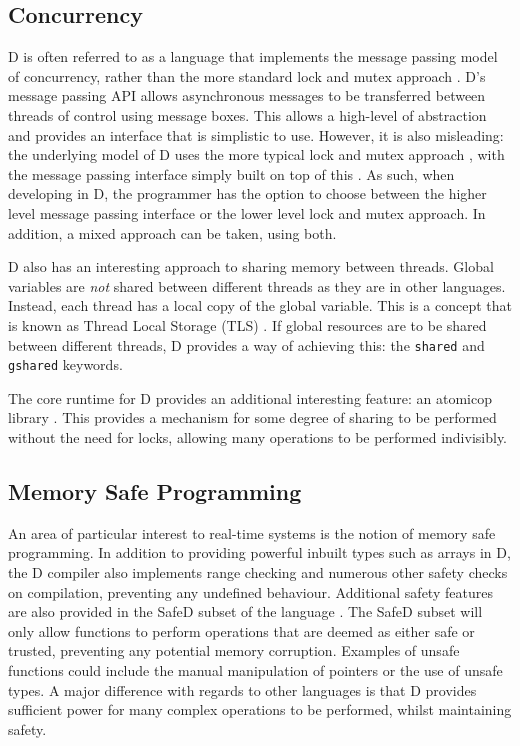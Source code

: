 \subsection{Concurrency}
D is often referred to as a language that implements the message passing model 
of concurrency, rather than the more standard lock and mutex approach 
\cite{ddili-book}. D's message passing API 
allows asynchronous messages to be transferred between threads of control using 
message boxes. This allows a high-level of abstraction and provides an 
interface that is simplistic to use. However, it is also misleading: the underlying 
model of D uses the more typical lock and mutex approach 
\cite{dlang-github-mutex}, 
with the message passing interface simply built on top of this 
\cite{dlang-github-concurrency}. 
As such, when developing in D, the programmer has the option to choose between 
the higher level message passing interface or the lower level lock and mutex 
approach. In addition, a mixed approach can be taken, using both. 
\par\bigskip\noindent
D also has an interesting approach to sharing memory between threads. 
Global variables are \emph{not} shared between different threads as they are in 
other languages. Instead, each thread has a local copy of the global variable. 
This is a concept that is known as Thread Local Storage (TLS) 
\cite{migrate-to-shared}. 
If global resources are to be shared between different threads, D provides a way of 
achieving this: the \texttt{shared} and
\texttt{\textunderscore{}\textunderscore{}gshared} keywords.
\par\bigskip\noindent
The core runtime for D provides an additional interesting feature: an atomicop 
library 
\cite{core-atomic}. 
This provides a mechanism for some degree of sharing to be performed without the 
need for locks, allowing many operations to be performed indivisibly.

\subsection{Memory Safe Programming}
An area of particular interest to real-time systems is the notion of memory 
safe programming. In addition to providing powerful inbuilt types such as arrays 
in D, the D compiler also implements range checking and numerous other 
safety checks on compilation, preventing any undefined behaviour.
Additional safety features are also provided in the SafeD subset of the language
\cite{safe-d}. The SafeD subset will only allow functions to perform 
operations that are deemed as either safe or trusted, preventing any 
potential memory corruption. Examples of unsafe functions could include the 
manual manipulation of pointers or the use of unsafe types. A major difference 
with regards to other languages is that D provides sufficient power for many complex 
operations to be performed, whilst maintaining safety.

